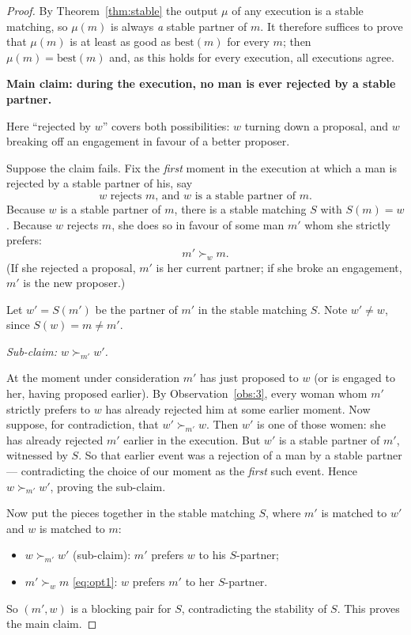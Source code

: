\documentclass[11pt,a4paper]{article}
\theoremstyle{plain}
\theoremstyle{definition}
\theoremstyle{remark}
\newcommand{\pr}[1]{\succ_{#1}}          %
\begin{document}
\begin{proof}
By Theorem~\ref{thm:stable} the output $\mu$ of any execution is a stable
matching, so $\mu(m)$ is always \emph{a} stable partner of $m$. It therefore
suffices to prove that $\mu(m)$ is at least as good as $\mathrm{best}(m)$ for
every $m$; then $\mu(m) = \mathrm{best}(m)$ and, as this holds for every
execution, all executions agree.

\medskip
\noindent\textbf{Main claim: during the execution, no man is ever rejected by
a stable partner.}

Here ``rejected by $w$'' covers both possibilities: $w$ turning down a
proposal, and $w$ breaking off an engagement in favour of a better proposer.

Suppose the claim fails. Fix the \emph{first} moment in the execution at which
a man is rejected by a stable partner of his, say
\[
  \text{$w$ rejects $m$, and $w$ is a stable partner of $m$.}
\]
Because $w$ is a stable partner of $m$, there is a stable matching $S$ with
$S(m) = w$. Because $w$ rejects $m$, she does so in favour of some man $m'$
whom she strictly prefers:
\begin{equation}\label{eq:opt1}
  m' \pr{w} m .
\end{equation}
(If she rejected a proposal, $m'$ is her current partner; if she broke an
engagement, $m'$ is the new proposer.)

Let $w' = S(m')$ be the partner of $m'$ in the stable matching $S$. Note
$w' \neq w$, since $S(w) = m \neq m'$.

\medskip
\noindent\emph{Sub-claim: $w \pr{m'} w'$.}

At the moment under consideration $m'$ has just proposed to $w$ (or is engaged
to her, having proposed earlier). By Observation~\ref{obs:3}, every woman whom
$m'$ strictly prefers to $w$ has already rejected him at some earlier moment.
Now suppose, for contradiction, that $w' \pr{m'} w$. Then $w'$ is one of those
women: she has already rejected $m'$ earlier in the execution. But $w'$ is a
stable partner of $m'$, witnessed by $S$. So that earlier event was a rejection
of a man by a stable partner --- contradicting the choice of our moment as the
\emph{first} such event. Hence $w \pr{m'} w'$, proving the sub-claim.

\medskip
Now put the pieces together in the stable matching $S$, where $m'$ is matched
to $w'$ and $w$ is matched to $m$:
\begin{itemize}[nosep]
  \item $w \pr{m'} w'$ \quad (sub-claim): $m'$ prefers $w$ to his $S$-partner;
  \item $m' \pr{w} m$ \quad \eqref{eq:opt1}: $w$ prefers $m'$ to her
        $S$-partner.
\end{itemize}
So $(m', w)$ is a blocking pair for $S$, contradicting the stability of $S$.
This proves the main claim.


\end{proof}
\end{document}

